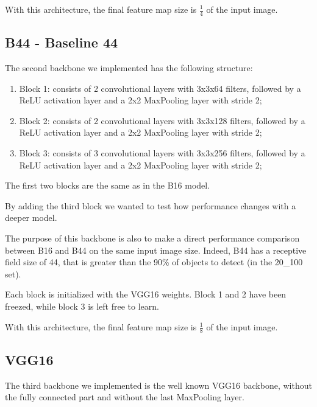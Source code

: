 \documentclass[a4paper,10pt]{report}
\begin{document}
With this architecture, the final feature map size is $\frac{1}{4}$ of the input image.

\subsection{B44 - Baseline 44}\label{subsec:b44}
The second backbone we implemented has the following structure:
\begin{enumerate}
  \item Block 1: consists of 2 convolutional layers with 3x3x64 filters, followed by a ReLU activation layer and a 2x2 MaxPooling layer with stride 2;
  \item Block 2: consists of 2 convolutional layers with 3x3x128 filters, followed by a ReLU activation layer and a 2x2 MaxPooling layer with stride 2;
  \item Block 3: consists of 3 convolutional layers with 3x3x256 filters, followed by a ReLU activation layer and a 2x2 MaxPooling layer with stride 2;
\end{enumerate}
The first two blocks are the same as in the B16 model. 

By adding the third block we wanted to test how performance changes with a deeper model.

The purpose of this backbone is also to make a direct performance comparison between B16 and B44 on the same input image size. Indeed, B44 has a receptive field size of 44, that is greater than the 90\% of objects to detect (in the 20\_100 set).

Each block is initialized with the VGG16 weights. Block 1 and 2 have been freezed, while block 3 is left free to learn.

With this architecture, the final feature map size is $\frac{1}{8}$ of the input image.

\subsection{VGG16}\label{subsec:vgg16}
The third backbone we implemented is the well known VGG16 backbone, without the fully connected part and without the last MaxPooling layer.
\end{document}
